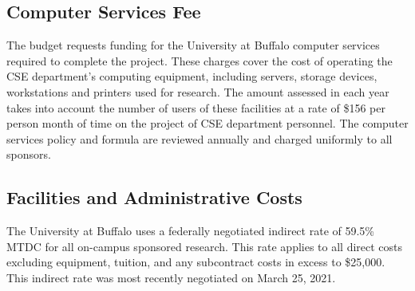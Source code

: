 \subsection*{Computer Services Fee}
The budget requests funding for the University at Buffalo computer services
required to complete the project. These charges cover the cost of operating
the CSE department's computing equipment, including servers, storage devices,
workstations and printers used for research. The amount assessed in each
year takes into account the number of users of these facilities at a rate of
\$156 per person month of time on the project of CSE department personnel.
The computer services policy and formula are reviewed annually and charged
uniformly to all sponsors. 

\subsection*{Facilities and Administrative Costs}

The University at Buffalo uses a federally negotiated indirect rate of
59.5\% MTDC for all on-campus sponsored research. This rate applies to all
direct costs excluding equipment, tuition, and any subcontract costs in
excess to \$25,000. This indirect rate was most recently negotiated on March 25, 2021.  



